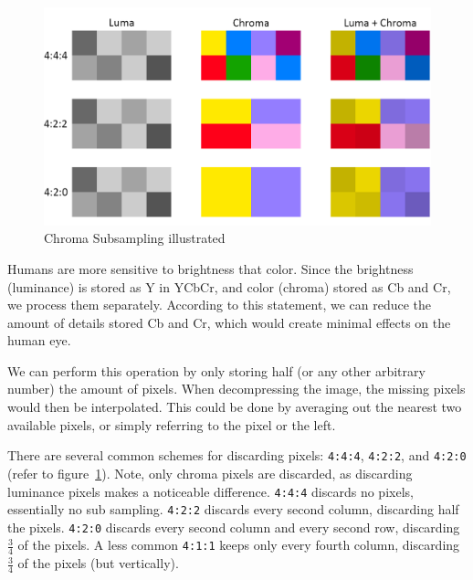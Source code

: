 \documentclass{article}
\begin{document}
\begin{figure}
\includegraphics[width=\linewidth]{./figures/subsampling.png}
\caption{Chroma Subsampling illustrated}
\label{fig:subsampling}
\end{figure}

Humans are more sensitive to brightness that color.
Since the brightness (luminance) is stored as Y in YCbCr, and color (chroma) stored as Cb and Cr, we process them separately.
According to this statement, we can reduce the amount of details stored Cb and Cr, which would create minimal effects on the human eye.

We can perform this operation by only storing half (or any other arbitrary number) the amount of pixels.
When decompressing the image, the missing pixels would then be interpolated.
This could be done by averaging out the nearest two available pixels, or simply referring to the pixel or the left.

There are several common schemes for discarding pixels: \texttt{4:4:4}, \texttt{4:2:2}, and \texttt{4:2:0} (refer to figure~\ref{fig:subsampling}).
Note, only chroma pixels are discarded, as discarding luminance pixels makes a noticeable difference.
\texttt{4:4:4} discards no pixels, essentially no sub sampling.
\texttt{4:2:2} discards every second column, discarding half the pixels.
\texttt{4:2:0} discards every second column and every second row, discarding $\frac{3}{4}$ of the pixels.
A less common \texttt{4:1:1} keeps only every fourth column, discarding $\frac{3}{4}$ of the pixels (but vertically).
\end{document}
